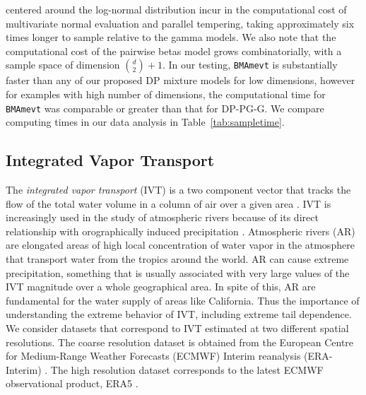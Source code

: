     centered around the log-normal distribution incur in the computational cost of 
    multivariate normal evaluation and parallel tempering, taking approximately six times
    longer to sample relative to the gamma models.  We also note that the 
    computational cost  of the pairwise betas model grows combinatorially, with a 
    sample space of dimension $\binom{d}{2} + 1$. In our testing, \verb|BMAmevt| is 
    substantially faster than any of our proposed DP mixture models for low dimensions, 
    however for examples with high number of dimensions, the computational time for 
    \verb|BMAmevt| was comparable or greater than that for DP-PG-G.  We compare computing
    times in our data analysis in Table~\ref{tab:sampletime}.

\subsection{Integrated Vapor Transport\label{subsec:ivt}}
The \emph{integrated vapor transport} (IVT) is a two component vector 
    that tracks the flow of the total water volume in a column of air 
    over a given area \citep{ralph2017}.  IVT is increasingly used in 
    the study of atmospheric rivers because of its direct relationship 
    with orographically induced precipitation \citep{neiman2009water}. 
    Atmospheric rivers (AR) are elongated areas of high 
    local concentration of water vapor in the atmosphere that transport water
    from the tropics around the world. AR can cause extreme 
    precipitation,  something that is usually associated with very large values
    of the IVT magnitude over a whole geographical area. In spite of this, AR
    are fundamental for the water supply of areas like California. Thus the
    importance of understanding the extreme behavior of IVT, including 
    extreme tail dependence. We consider datasets that correspond to IVT
    estimated at two different spatial resolutions. The coarse resolution dataset
    is obtained from the European Centre for Medium-Range Weather Forecasts
    (ECMWF) Interim reanalysis (ERA-Interim) \citep{berrisford2011atmospheric,dee2011era}. 
    The high resolution dataset corresponds to the latest ECMWF 
    observational product, ERA5 \citep{hersbach2020era5}. 

